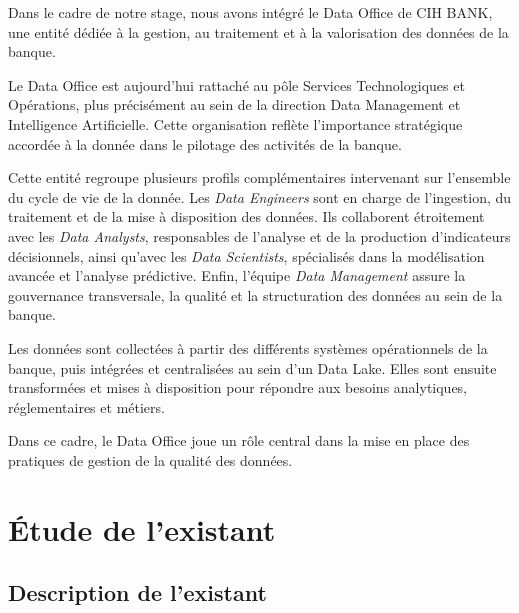 Dans le cadre de notre stage, nous avons intégré le Data Office de CIH BANK, une entité dédiée à la gestion, au traitement et à la valorisation des données de la banque.

Le Data Office est aujourd’hui rattaché au pôle Services Technologiques et Opérations, plus précisément au sein de la direction Data Management et Intelligence Artificielle. Cette organisation reflète l’importance stratégique accordée à la donnée dans le pilotage des activités de la banque.

Cette entité regroupe plusieurs profils complémentaires intervenant sur l’ensemble du cycle de vie de la donnée. Les \textit{Data Engineers} sont en charge de l’ingestion, du traitement et de la mise à disposition des données. Ils collaborent étroitement avec les \textit{Data Analysts}, responsables de l’analyse et de la production d’indicateurs décisionnels, ainsi qu'avec les \textit{Data Scientists}, spécialisés dans la modélisation avancée et l’analyse prédictive. Enfin, l’équipe \textit{Data Management} assure la gouvernance transversale, la qualité et la structuration des données au sein de la banque.

Les données sont collectées à partir des différents systèmes opérationnels de la banque, puis intégrées et centralisées au sein d’un Data Lake. Elles sont ensuite transformées et mises à disposition pour répondre aux besoins analytiques, réglementaires et métiers.

Dans ce cadre, le Data Office joue un rôle central dans la mise en place des pratiques de gestion de la qualité des données.


\section{Étude de l'existant}

\subsection{Description de l'existant}

